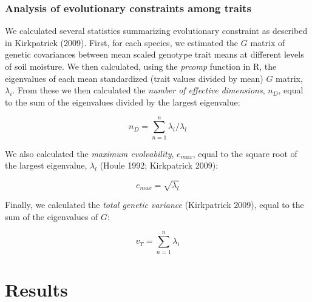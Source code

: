 \documentclass[jou,floatsintext]{apa6}
\begin{document}
\hypertarget{analysis-of-evolutionary-constraints-among-traits}{%
\subsubsection{Analysis of evolutionary constraints among traits}\label{analysis-of-evolutionary-constraints-among-traits}}

We calculated several statistics summarizing evolutionary constraint as described in Kirkpatrick (2009). First, for each species, we estimated the \(G\) matrix of genetic covariances between mean scaled genotype trait means at different levels of soil moisture. We then calculated, using the \emph{prcomp} function in R, the eigenvalues of each mean standardized (trait values divided by mean) \(G\) matrix, \(\lambda_i\). From these we then calculated the \emph{number of effective dimensions}, \(n_{D}\), equal to the sum of the eigenvalues divided by the largest eigenvalue:

\[n_{D} = \sum_{n=1}^{n} \lambda_i/\lambda_l\]

We also calculated the \emph{maximum evolvability}, \(e_{max}\), equal to the square root of the largest eigenvalue, \(\lambda_l\) (Houle 1992; Kirkpatrick 2009):

\[e_{max} = \sqrt{\lambda_l}\]

Finally, we calculated the \emph{total genetic variance} (Kirkpatrick 2009), equal to the sum of the eigenvalues of \(G\):

\[v_T = \sum_{n=1}^{n} \lambda_i\]

\hypertarget{results}{%
\section{Results}\label{results}}
\end{document}
